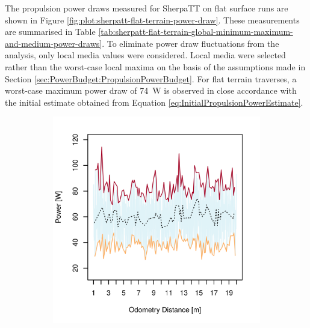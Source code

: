 The propulsion power draws measured for SherpaTT on flat surface runs are shown in Figure \ref{fig:plot:sherpatt-flat-terrain-power-draw}. These measurements are summarised in Table \ref{tab:sherpatt-flat-terrain-global-minimum-maximum-and-medium-power-draws}. To eliminate power draw fluctuations from the analysis, only local media values were considered. Local media were selected rather than the worst-case local maxima on the basis of the assumptions made in Section \ref{sec:PowerBudget:PropulsionPowerBudget}. For flat terrain traverses, a worst-case maximum power draw of \SI{74}{\watt} is observed in close accordance with the initial estimate obtained from Equation \ref{eq:InitialPropulsionPowerEstimate}.

\begin{figure}[h]
\captionsetup[subfigure]{justification=centering}
\vspace{-2ex}
	\centering
    \setlength{\subfigureWidth}{0.50\textwidth}
    \setlength{\graphicsHeight}{80mm}
    \hypersetup{hidelinks=true}%
    \begin{subfigure}[t]{\subfigureWidth}
        \centering
        \includegraphics[height=\graphicsHeight]{sections/design/power-budget/plots/locomotion-power-draw-on-flat-terrain-1.png}

\end{subfigure}
\end{figure}
